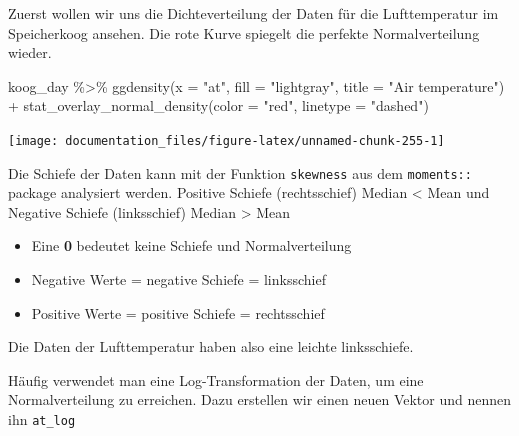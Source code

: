 \documentclass[
]{article}
\newenvironment{Shaded}{\begin{snugshade}}{\end{snugshade}}
\newcommand{\AttributeTok}[1]{\textcolor[rgb]{0.77,0.63,0.00}{#1}}
\newcommand{\DocumentationTok}[1]{\textcolor[rgb]{0.56,0.35,0.01}{\textbf{\textit{#1}}}}
\newcommand{\FunctionTok}[1]{\textcolor[rgb]{0.00,0.00,0.00}{#1}}
\newcommand{\NormalTok}[1]{#1}
\newcommand{\SpecialCharTok}[1]{\textcolor[rgb]{0.00,0.00,0.00}{#1}}
\newcommand{\StringTok}[1]{\textcolor[rgb]{0.31,0.60,0.02}{#1}}
\providecommand{\tightlist}{%
  \setlength{\itemsep}{0pt}\setlength{\parskip}{0pt}}
\begin{document}
Zuerst wollen wir uns die Dichteverteilung der Daten für die Lufttemperatur im Speicherkoog ansehen. Die rote Kurve spiegelt die perfekte Normalverteilung wieder.

\begin{Shaded}
\begin{Highlighting}[]
\NormalTok{koog\_day }\SpecialCharTok{\%\textgreater{}\%}
  \FunctionTok{ggdensity}\NormalTok{(}\AttributeTok{x =} \StringTok{"at"}\NormalTok{, }\AttributeTok{fill =} \StringTok{"lightgray"}\NormalTok{, }\AttributeTok{title =} \StringTok{"Air temperature"}\NormalTok{) }\SpecialCharTok{+}
  \FunctionTok{stat\_overlay\_normal\_density}\NormalTok{(}\AttributeTok{color =} \StringTok{"red"}\NormalTok{, }\AttributeTok{linetype =} \StringTok{"dashed"}\NormalTok{)}
\end{Highlighting}
\end{Shaded}

\begin{center}\texttt{[image: documentation\_files/figure-latex/unnamed-chunk-255-1]} \end{center}

Die Schiefe der Daten kann mit der Funktion \texttt{skewness} aus dem \texttt{moments::} package analysiert werden. Positive Schiefe (rechtsschief) Median \textless{} Mean und Negative Schiefe (linksschief) Median \textgreater{} Mean

\begin{Shaded}
\end{Shaded}

\begin{itemize}
\tightlist
\item
  Eine \textbf{0} bedeutet keine Schiefe und Normalverteilung
\item
  Negative Werte = negative Schiefe = linksschief
\item
  Positive Werte = positive Schiefe = rechtsschief
\end{itemize}

Die Daten der Lufttemperatur haben also eine leichte linksschiefe.

Häufig verwendet man eine Log-Transformation der Daten, um eine Normalverteilung zu erreichen. Dazu erstellen wir einen neuen Vektor und nennen ihn \texttt{at\_log}
\end{document}
